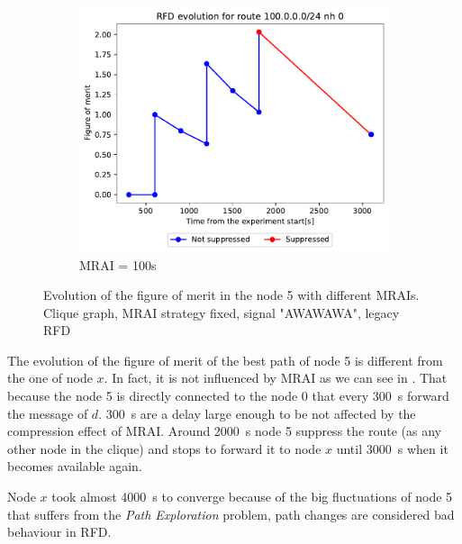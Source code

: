 \begin{figure}[h]
\begin{subfigure}[b]{0.49\textwidth}
         \label{fig:clique_5_mrai50}
     \end{subfigure}
     \hfill
     \begin{subfigure}[b]{0.49\textwidth}
         \centering
         \includegraphics[width=\textwidth]{images/RFD/clique/FigureOfMerit/mrai21_RFD_5_rfd_R1.pdf}
         \caption{MRAI = 100s}
         \label{fig:clique_5_mrai100}
     \end{subfigure}
		\caption{Evolution of the figure of merit in the node \num{5} with different MRAIs.
		Clique graph, MRAI strategy fixed, signal "AWAWAWA", legacy RFD}
        \label{fig:clique_node5}
\end{figure}

The evolution of the figure of merit of the best path of node \num{5} is different
from the one of node $x$.
In fact, it is not influenced by \ac{MRAI} as we can see in .
That because the node \num{5} is directly connected to the node \num{0} that every
\SI{300}{\second} forward the message of $d$. \SI{300}{\second} are a delay large
enough to be not affected by the compression effect of \ac{MRAI}.
Around \SI{2000}{\second} node \num{5} suppress the route (as any other node in the
clique) and stops to forward it to node $x$ until \SI{3000}{\second} when it becomes
available again.

Node $x$ took almost \SI{4000}{\second} to converge because of the big fluctuations
of node \num{5} that suffers from the \textit{Path Exploration} problem, path
changes are considered bad behaviour in \ac{RFD}.


